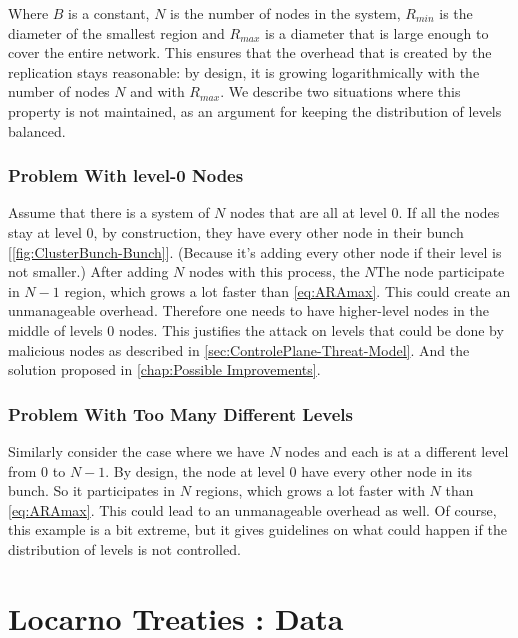 \documentclass[a4paper,11pt,oneside]{report}
\begin{document}
Where $B$ is a constant, $N$ is the number of nodes in the system, $R_{min}$ is
the diameter of the smallest region and $R_{max}$ is a diameter that is large
enough to cover the entire network. This ensures that the overhead that is
created by the replication stays reasonable: by design, it is growing
logarithmically with the number of nodes $N$ and with $R_{max}$. We describe two situations where this property is not maintained, as an argument
for keeping the distribution of levels balanced.

\subsection{Problem With level-0 Nodes} \label{app:levels-zero}
Assume that there is a system of $N$ nodes that are all at level 0. If all
the nodes stay at level 0, by construction, they have every other node in
their bunch [\autoref{fig:ClusterBunch-Bunch}]. (Because it’s adding every other node if their level is not smaller.) After adding $N$ nodes with this
process, the $N$The node participate in $N-1$ region, which grows a lot
faster than \autoref{eq:ARAmax}. This could create an unmanageable overhead.
Therefore one needs to have higher-level nodes in the middle of levels 0 nodes.
This justifies the attack on levels that could be done by malicious nodes as
described in \autoref{sec:ControlePlane-Threat-Model}. And the solution
proposed in \autoref{chap:Possible Improvements}.

\subsection{Problem With Too Many Different Levels} Similarly consider the case
where we have $N$ nodes and each is at a different level from $0$ to $N-1$. By
design, the node at level $0$ have every other node in its bunch. So it
participates in $N$ regions, which grows a lot faster with $N$ than
\autoref{eq:ARAmax}. This could lead to an unmanageable overhead as well. Of
course, this example is a bit extreme, but it gives guidelines on what could
happen if the distribution of levels is not controlled.

\chapter{Locarno Treaties : Data} \label{app:LocarnoTreaties-data}
\end{document}
